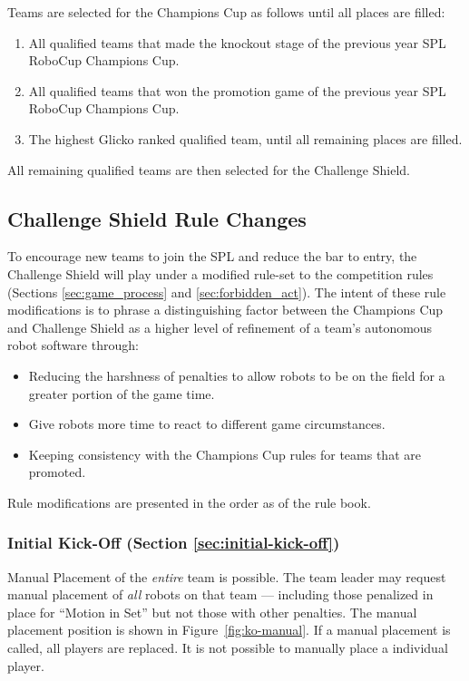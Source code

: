 Teams are selected for the Champions Cup as follows until all places are filled:
\begin{enumerate}
    \item All qualified teams that made the knockout stage of the previous year SPL RoboCup Champions Cup.
    \item All qualified teams that won the promotion game  of the previous year SPL RoboCup Champions Cup.
    \item The highest Glicko ranked qualified team, until all remaining places are filled.
\end{enumerate}

All remaining qualified teams are then selected for the Challenge Shield.


\subsection{Challenge Shield Rule Changes}
\label{sec:cs-rule-changes}

To encourage new teams to join the SPL and reduce the bar to entry, the Challenge Shield will play under a modified rule-set to the competition rules (Sections \ref{sec:game_process} and \ref{sec:forbidden_act}). The intent of these rule modifications is to phrase a distinguishing factor between the Champions Cup and Challenge Shield as a higher level of refinement of a team's autonomous robot software through:
\begin{itemize}
    \item Reducing the harshness of penalties to allow robots to be on the field for a greater portion of the game time.
    \item Give robots more time to react to different game circumstances.
    \item Keeping consistency with the Champions Cup rules for teams that are promoted.
\end{itemize}

Rule modifications are presented in the order as of the rule book.

\subsubsection{Initial Kick-Off (Section \ref{sec:initial-kick-off})}
Manual Placement of the \emph{entire} team is possible. The team leader may request manual placement of \emph{all} robots on that team --- including those penalized in place for ``Motion in Set'' but not those with other penalties. The manual placement position is shown in Figure~\ref{fig:ko-manual}. If a manual placement is called, all players are replaced. It is not possible to manually place a individual player.

